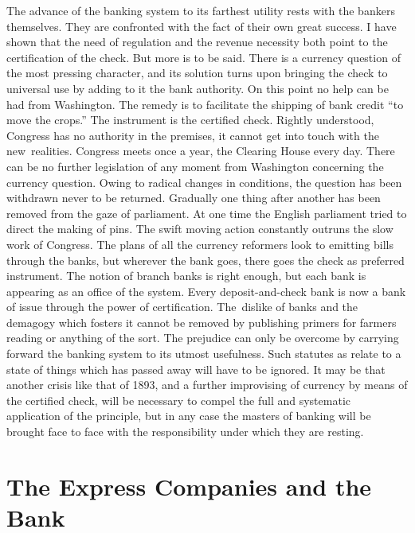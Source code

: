 \documentclass[openany,nobib]{tufte-book}
\let\oldchapter\chapter
\def\chapter{%
  \setcounter{footnote}{0}%
  \oldchapter
}
\begin{document}
The advance of the banking system to its farthest utility rests with the
bankers themselves. They are confronted with the fact of their own great
success. I have shown that the need of regulation and the revenue
necessity both point to the certification of the check. But more is to
be said. There is a currency question of the most pressing character,
and its solution turns upon bringing the check to universal use by
adding to it the bank authority. On this point no help can be had from
Washington. The remedy is to facilitate the shipping of bank credit ``to
move the crops.'' The instrument is the certified check. Rightly
understood, Congress has no authority in the premises, it cannot get
into touch with the new~realities. Congress meets once a year, the
Clearing House every day. There can be no further legislation of any
moment from Washington concerning the currency question. Owing to
radical changes in conditions, the question has been withdrawn never to
be returned. Gradually one thing after another has been removed from the
gaze of parliament. At one time the English parliament tried to direct
the making of pins. The swift moving action constantly outruns the slow
work of Congress. The plans of all the currency reformers look to
emitting bills through the banks, but wherever the bank goes, there goes
the check as preferred instrument. The notion of branch banks is right
enough, but each bank is appearing as an office of the system. Every
deposit-and-check bank is now a bank of issue through the power of
certification. The~dislike of banks and the demagogy which fosters it
cannot be removed by publishing primers for farmers\textquotesingle{}
reading or anything of the sort. The prejudice can only be overcome by
carrying forward the banking system to its utmost usefulness. Such
statutes as relate to a state of things which has passed away will have
to be ignored. It may be that another crisis like that of 1893, and a
further improvising of currency by means of the certified check, will be
necessary to compel the full and systematic application of the
principle, but in any case the masters of banking will be brought face
to face with the responsibility under which they are resting.


\chapter[The Express Companies and the Bank]{The Express Companies and the Bank}
\label{ch:The Express Companies and the Bank}
\end{document}
